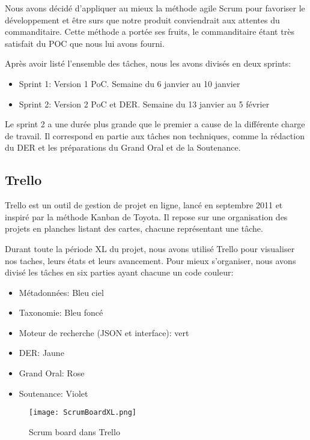 Nous avons décidé d'appliquer au mieux la méthode agile Scrum pour favoriser le développement et être surs que notre produit conviendrait aux attentes du commanditaire.
Cette méthode a portée ses fruits, le commanditaire étant très satisfait du POC que nous lui avons fourni.

Après avoir listé l'ensemble des tâches, nous les avons divisés en deux sprints:
\begin{itemize}
    \item Sprint 1:\newline
    Version 1 PoC.
    Semaine du 6 janvier au 10 janvier 
    \item Sprint 2:\newline
    Version 2 PoC et DER\@.
    Semaine du 13 janvier au 5 février
\end{itemize}

Le sprint 2 a une durée plus grande que le premier a cause de la différente charge de travail.
Il correspond en partie aux tâches non techniques, comme la rédaction du DER et les préparations du Grand Oral et de la Soutenance. 


\subsection{Trello}
Trello est un outil de gestion de projet en ligne, lancé en septembre 2011 et inspiré par la méthode Kanban de Toyota.
Il repose sur une organisation des projets en planches listant des cartes, chacune représentant une tâche. 

Durant toute la période XL du projet, nous avons utilisé Trello pour visualiser nos taches, leurs états et leurs avancement. 
Pour mieux s’organiser, nous avons divisé les tâches en six parties ayant chacune un code couleur: 

\begin{itemize}
    \item Métadonnées: Bleu ciel 
    \item Taxonomie: Bleu foncé 
    \item Moteur de recherche (JSON et interface): vert
    \item DER\@: Jaune
    \item Grand Oral: Rose
    \item Soutenance: Violet 
\end{itemize}


\begin{figure}[h!]
  \centering
  \texttt{[image: ScrumBoardXL.png]}
	\caption[]{Scrum board dans Trello}
	\label{fig:trello}
\end{figure}

